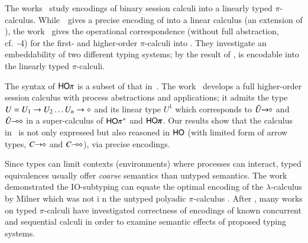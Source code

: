 
The works~\cite{DemangeonH11,Dardha:2012:STR:2370776.2370794} 
study encodings of binary session calculi into a linearly typed $\pi$-calculus. 
While~\cite{DemangeonH11}~gives a precise encoding of \sessp into a linear calculus 
(an extension of \cite{BHY}),  
the work~\cite{Dardha:2012:STR:2370776.2370794} 
gives the operational correspondence 
(without full abstraction, cf.~-4)
for the first- and higher-order 
$\pi$-calculi into \cite{LinearPi}. 
They investigate an embeddability of two different typing systems;
by the result of \cite{DemangeonH11}, 
\HOpp is encodable  into the linearly typed $\pi$-calculi.     

The syntax of $\mathsf{HO}\pi$ is a subset of that in~\cite{tlca07,MostrousY15}.
The work~\cite{tlca07} develops a full higher-order session calculus
with process abstractions and applications; it admits the type 
$U=U_1 \rightarrow U_2 \dots U_n \rightarrow \diamond$ and its linear type 
$U^1$
which corresponds to $\tilde{U}\!\! \rightarrow\!\! \diamond$ and $\tilde{U}\!\! \multimap\!\! \diamond$ in 
a super-calculus of $\mathsf{HO}\pi^{\mathsf +}$ and $\PHOp$. 
Our results show that
the calculus in~\cite{tlca07} is not only expressed but 
also reasoned in 
$\mathsf{HO}$ (with limited form of arrow types, $C\!\! \rightarrow\!\! \diamond$ and $C\!\! \multimap\!\! \diamond$), via precise encodings.   



Since types can limit
contexts (environments) where processes can interact, typed equivalences
usually offer {\em coarse} semantics than untyped semantics. 
The work  \cite{PiSa96b} demonstrated the IO-subtyping can equate 
the optimal encoding of the $\lambda$-calculus by Milner which was not i
n the untyped polyadic $\pi$-calculus \cite{MilnerR:funp}. 
After \cite{PiSa96b}, many works on typed $\pi$-calculi 
have investigated correctness of encodings of known concurrent and
sequential calculi in order to examine semantic
effects of proposed typing systems. 

